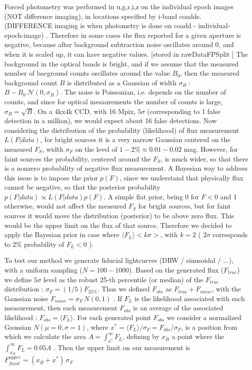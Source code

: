 \documentclass[fleqn,usenatbib]{mnras}  %
\begin{document}
Forced photometry was performed in u,g,r,i,z  on the individual epoch images (NOT difference imaging),  in locations specified by i-band coadds. (DIFFERENCE imaging is when photometry is done on  coadd - individual-epoch-image) . Therefore in some cases the flux reported for a given aperture is negative, because after background subtraction noise oscillates around 0, and when it is scaled up,  it can have negative values. [stored in rawDataFPSplit ]  The background in the  optical bands is bright, and if we assume that the measured number of bacground counts oscillates around the value $B_{0}$, then the measured background count $B$  is distributed as  a Gaussian of width $\sigma_{B}$ :   $B-B_{0}  ~  \mathcal{N}(0,\sigma_{B})$. The noise is Poissonian, i.e. depends on  the number of counts, and since for optical mesaurements the number of counts is large,  $\sigma_{B} = \sqrt {B}$. On a 4kx4k  CCD, with 16 Mpix, $5\sigma$ (corresponding  to  1 false detection in a million), we would expect about 16 false detections.  
Now considering the distribution of the probability (likelihood) of flux measurement   $L(F|data)$, for bright sources it is a very narrow Gaussian centered on the measured $F_{S}$, width $\sigma_{F}$ on the level of $1-2 \%  \approx 0.01-0.02$ mag. However, for faint sources the probability, centered around the $F_{S}$, is much wider, so that there is a nonzero probability of negative flux measurement. A Bayesian  way to address this issue is to impose the prior $p(F)$, since we understand that physically flux cannot be negative, so that the posterior probability $p(F|data) \propto L(F|data) p(F)$. A simple flat prior, being 0 for $F<0$ and 1 otherwise,  would not affect the measured $F_S$ for bright sources, but for faint sources it would move the distribution (posterior) to be above zero flux. This would be the upper limit on the flux of that source.  Therefore we decided to apply the Bayesian prior  in case where  $ \langle F_{L} \rangle  < k \sigma>$, with $k=2$ ( $2 \sigma$ corresponds to $2\%$ probability of $F_{L} < 0$ ). 

To test our method we generate fiducial lightcurves (DRW / sinusoidal / ...), with a uniform sampling ($N=100-1000$). Based on the generated flux ($F_{true}$) we define $5\sigma$ level as the robust 25-th percentile (or median) of the $F_{true}$ distribution :  $\sigma_{F} = (1/5)  F_{25 \%}$. Thus we defined $F_{obs}$ as $F_{true} + F_{noise}$, with the Gaussian noise $F_{noise} = \sigma_{F}  \, N(0,1)$ . If $F_{L}$ is the likelihood associated with each measurement, then  each measurement $F_{obs}$ is an average of the associated likelihood : $F_{obs} = \langle F_{L} \rangle$.    For each generated point $F_{obs}$  we consider a normalized Gaussian $N(\mu=0, \sigma=1)$, where $x^{*} = \langle F_{L} \rangle / \sigma_{F} =  F_{obs} / \sigma_{F}$, is  a position from which we  calculate the area $A = \int_{x^{*}}^{\infty} {F_{L}}$, defining by $x_{B}$ a point where the $ \int_{x_{B}} ^{\infty} {F_{L}}= 0.05 A$  . Then  the upper limit on our measurement  is  $F_{faint} ^ {upper} = (x_{B} + x^{*}) \, \sigma_{F}$
\end{document}
